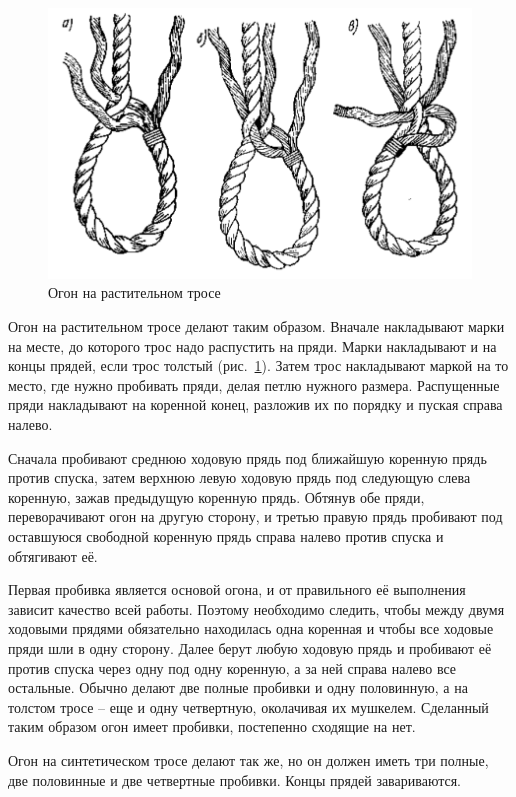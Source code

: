\documentclass[a4paper, 12pt, twoside, final]{scrbook}
\begin{document}
\begin{figure}[htbp]
   \centering
   \includegraphics{pics/66_Ogon_na_rast_trose} %
   \caption{Огон на растительном тросе}
   \label{fig:66}
\end{figure}

Огон на растительном тросе делают таким образом. Вначале накладывают марки на месте, до которого трос надо распустить на пряди. Марки накладывают и на концы прядей, если трос толстый (рис.~\ref{fig:66}). Затем трос накладывают маркой на то место, где нужно пробивать пряди, делая петлю нужного размера. Распущенные пряди накладывают на коренной конец, разложив их по порядку и пуская справа налево.

Сначала пробивают среднюю ходовую прядь под ближайшую коренную прядь против спуска, затем верхнюю левую ходовую прядь под следующую слева коренную, зажав предыдущую коренную прядь. Обтянув обе пряди, переворачивают огон на другую сторону, и третью правую прядь пробивают под оставшуюся свободной коренную прядь справа налево против спуска и обтягивают её.

Первая пробивка является основой огона, и от правильного её выполнения зависит качество всей работы. Поэтому необходимо следить, чтобы между двумя ходовыми прядями обязательно находилась одна коренная и чтобы все ходовые пряди шли в одну сторону. Далее берут любую ходовую прядь и пробивают её против спуска через одну под одну коренную, а за ней справа налево все остальные. Обычно делают две полные пробивки и одну половинную, а на толстом тросе \--- еще и одну четвертную, околачивая их мушкелем. Сделанный таким образом огон имеет пробивки, постепенно сходящие на нет.

Огон на синтетическом тросе делают так же, но он должен иметь три полные, две половинные и две четвертные пробивки. Концы прядей завариваются.
\end{document}
